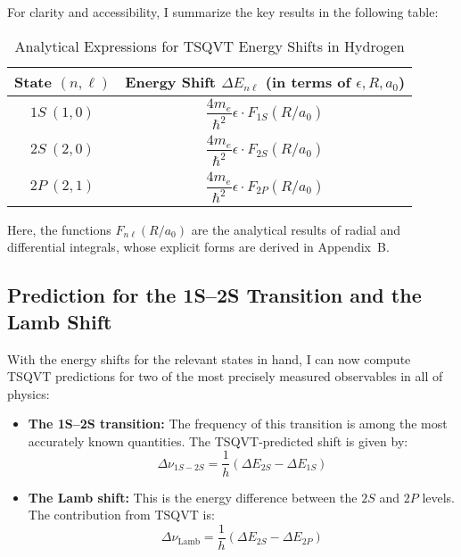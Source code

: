 \documentclass[a4paper]{article}
\begin{document}
For clarity and accessibility, I summarize the key results in the following table:

\begin{table}[h]
	\centering
	\caption{Analytical Expressions for TSQVT Energy Shifts in Hydrogen}
	\begin{tabular}{|c|c|}
		\hline
		\textbf{State} $(n, \ell)$ & \textbf{Energy Shift} $\Delta E_{n\ell}$ (in terms of $\epsilon, R, a_0$) \\
		\hline
		$1S\ (1, 0)$ & $\dfrac{4m_e}{\hbar^2} \epsilon \cdot F_{1S}(R/a_0)$ \\
		$2S\ (2, 0)$ & $\dfrac{4m_e}{\hbar^2} \epsilon \cdot F_{2S}(R/a_0)$ \\
		$2P\ (2, 1)$ & $\dfrac{4m_e}{\hbar^2} \epsilon \cdot F_{2P}(R/a_0)$ \\
		\hline
	\end{tabular}
\end{table}

Here, the functions $F_{n\ell}(R/a_0)$ are the analytical results of radial and differential integrals, whose explicit forms are derived in Appendix~B.

\subsection{Prediction for the 1S--2S Transition and the Lamb Shift}

With the energy shifts for the relevant states in hand, I can now compute TSQVT predictions for two of the most precisely measured observables in all of physics:

\begin{itemize}
	\item \textbf{The 1S--2S transition:} \cite{Beyer2017} The frequency of this transition is among the most accurately known quantities. The TSQVT-predicted shift is given by:
	\begin{equation}
		\Delta \nu_{1S-2S} = \frac{1}{h} \left( \Delta E_{2S} - \Delta E_{1S} \right)
	\end{equation}
	
	\item \textbf{The Lamb shift:}\cite{Bezginov2019} This is the energy difference between the $2S$ and $2P$ levels. The contribution from TSQVT is:
	\begin{equation}
		\Delta \nu_{\text{Lamb}} = \frac{1}{h} \left( \Delta E_{2S} - \Delta E_{2P} \right)
	\end{equation}
\end{itemize}
\end{document}
